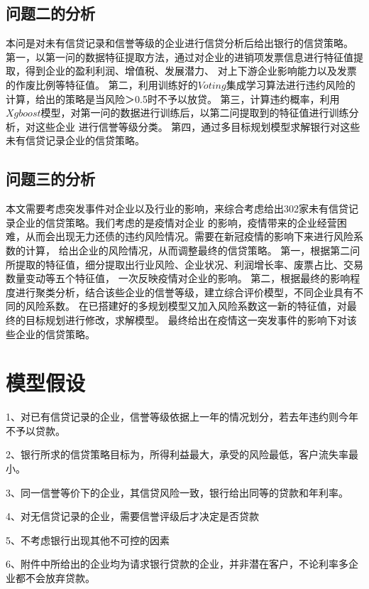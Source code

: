 \documentclass[UTF8]{ctexart}
\begin{document}
		\subsection{问题二的分析}
		本问是对未有信贷记录和信誉等级的企业进行信贷分析后给出银行的信贷策略。
		第一，以第一问的数据特征提取方法，通过对企业的进销项发票信息进行特征值提取，得到企业的盈利利润、增值税、发展潜力、
		对上下游企业影响能力以及发票的作废比例等特征值。
		第二，利用训练好的$Voting$集成学习算法进行违约风险的计算，给出的策略是当风险＞0.5时不予以放贷。
		第三，计算违约概率，利用$Xgboost$模型，对第一问的数据进行训练后，以第二问提取到的特征值进行训练分析，对这些企业
		进行信誉等级分类。
		第四，通过多目标规划模型求解银行对这些未有信贷记录企业的信贷策略。
		\subsection{问题三的分析}
		本文需要考虑突发事件对企业以及行业的影响，来综合考虑给出302家未有信贷记录企业的信贷策略。我们考虑的是疫情对企业
		的影响，疫情带来的企业经营困难，从而会出现无力还债的违约风险情况。需要在新冠疫情的影响下来进行风险系数的计算，
		给出企业的风险情况，从而调整最终的信贷策略。
		第一，根据第二问所提取的特征值，细分提取出行业风险、企业状况、利润增长率、废票占比、交易数量变动等五个特征值，
		一次反映疫情对企业的影响。
		第二，根据最终的影响程度进行聚类分析，结合该些企业的信誉等级，建立综合评价模型，不同企业具有不同的风险系数。
		在已搭建好的多规划模型又加入风险系数这一新的特征值，对最终的目标规划进行修改，求解模型。
		最终给出在疫情这一突发事件的影响下对该些企业的信贷策略。
		
		\section{模型假设}
		1、对已有信贷记录的企业，信誉等级依据上一年的情况划分，若去年违约则今年不予以贷款。
		
		2、银行所求的信贷策略目标为，所得利益最大，承受的风险最低，客户流失率最小。
		
		3、同一信誉等价下的企业，其信贷风险一致，银行给出同等的贷款和年利率。
		
		4、对无信贷记录的企业，需要信誉评级后才决定是否贷款
		
		5、不考虑银行出现其他不可控的因素
		
		6、附件中所给出的企业均为请求银行贷款的企业，并非潜在客户，不论利率多企业都不会放弃贷款。
		
		
\end{document}
